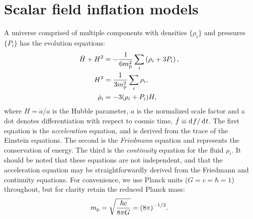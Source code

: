 \section{Scalar field inflation models}
\label{sec:Scalar_field_inflation_models}
A universe comprised of multiple components  with densities
\(\{\rho_i\}\) and pressures \(\{P_i\}\) has the evolution equations:
\begin{align}
  \dot{H}+H^2 &= 
  -\frac{1}{6m_{\mathrm{p}}^2}\sum\limits_i\left( \rho_i + 3P_i\right), 
  \label{eqn:Raychaudhuri_rho}
  \\
  H^2 &= 
  \frac{1}{3m_{\mathrm{p}}^2}\sum\limits_i \rho_i, 
  \\
  \dot{\rho}_i 
  &= -3(\rho_i + P_i)H,  
  \label{eqn:conservation}
\end{align}
where \(H=\dot{a}/a\) is the Hubble parameter, \(a\) is the normalized scale factor and a dot denotes differentiation with respect to cosmic time, \(\dot{f}\equiv \operatorname{d}^{}\!{f}/\operatorname{d}^{}\!{t}\). The first equation is the {\em acceleration\/} equation, and is derived from the trace of the Einstein equations. The second is the {\em Friedmann\/} equation and represents the conservation of energy. The third is the {\em continuity\/} equation for the fluid \(\rho_i\). It should be noted that these equations are not independent, and that the acceleration equation may be straightforwardly derived from the Friedmann and continuity equations.  For convenience, we use Planck units (\(G=c=\hbar=1\)) throughout, but for clarity retain the reduced Planck mass: 
\[m_{\mathrm{p}} = \sqrt{\frac{\hbar c}{8\pi G}} = {(8\pi)}^{-1/2}.\]  


